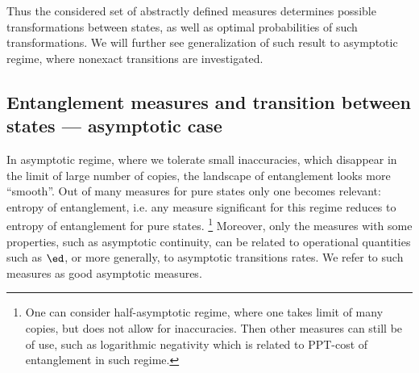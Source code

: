 \documentclass[twocolumn,aps,rmp]{revtex4}
\begin{document}
Thus the considered set of abstractly defined measures determines
possible transformations between states, as well as optimal probabilities
of such transformations. We will further see generalization of such
result to asymptotic regime, where nonexact transitions are  investigated.




\subsection{Entanglement measures and transition between states --- asymptotic case}
\label{subsec:asym} In asymptotic  regime, where we tolerate small
inaccuracies, which disappear in the limit of large number of
copies, the landscape of entanglement looks more ``smooth''.
Out of many measures for pure states only one becomes
relevant: entropy of entanglement, i.e. any measure significant for
this regime reduces to entropy of entanglement for pure states.
\footnote{One can consider half-asymptotic regime, where one takes limit
of many copies, but does not allow for inaccuracies. Then other measures
can still be of use, such as logarithmic negativity which is related
to PPT-cost of entanglement \cite{AudenaertPE2002-PPT} in such regime.}
Moreover, only the measures with some properties, such as asymptotic
continuity, can be related to operational quantities such as $\ed$,
or more generally, to asymptotic transitions rates. We refer to such
measures as good asymptotic measures.
\end{document}
